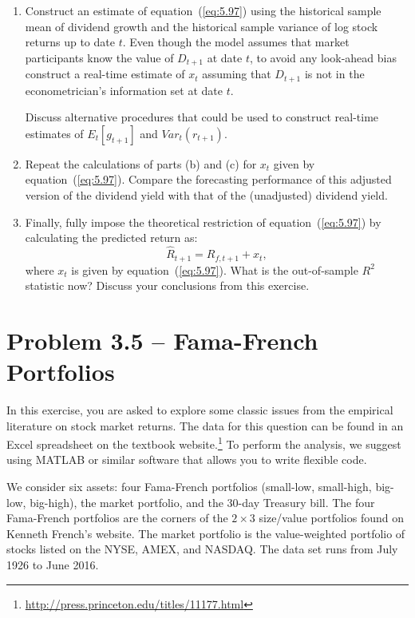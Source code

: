 \documentclass[12pt]{article}
\begin{document}
\begin{enumerate}[label=\textbf{(\alph*)}]
    \item Construct an estimate of equation~(\ref{eq:5.97}) using the historical sample mean of dividend growth and the historical sample variance of log stock returns up to date $t$. Even though the model assumes that market participants know the value of $D_{t+1}$ at date $t$, to avoid any look-ahead bias construct a real-time estimate of $x_t$ assuming that $D_{t+1}$ is not in the econometrician’s information set at date $t$.

    Discuss alternative procedures that could be used to construct real-time estimates of $E_t[g_{t+1}]$ and $Var_t(r_{t+1})$.

    \item Repeat the calculations of parts (b) and (c) for $x_t$ given by equation~(\ref{eq:5.97}). Compare the forecasting performance of this adjusted version of the dividend yield with that of the (unadjusted) dividend yield.

    \item Finally, fully impose the theoretical restriction of equation~(\ref{eq:5.97}) by calculating the predicted return as:
    \begin{equation}
        \hat{R}_{t+1} = R_{f,t+1} + x_t,
        \label{eq:5.98}
    \end{equation}
    where $x_t$ is given by equation~(\ref{eq:5.97}). What is the out-of-sample $R^2$ statistic now? Discuss your conclusions from this exercise.

\end{enumerate}


\section*{Problem 3.5 -- Fama-French Portfolios}

In this exercise, you are asked to explore some classic issues from the empirical literature on stock market returns. The data for this question can be found in an Excel spreadsheet on the textbook website.\footnote{\url{http://press.princeton.edu/titles/11177.html}} To perform the analysis, we suggest using MATLAB or similar software that allows you to write flexible code.

We consider six assets: four Fama-French portfolios (small-low, small-high, big-low, big-high), the market portfolio, and the 30-day Treasury bill. The four Fama-French portfolios are the corners of the $2 \times 3$ size/value portfolios found on Kenneth French’s website. The market portfolio is the value-weighted portfolio of stocks listed on the NYSE, AMEX, and NASDAQ. The data set runs from July 1926 to June 2016.
\end{document}
